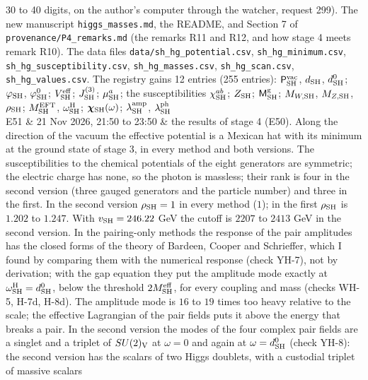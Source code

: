 \documentclass[
  10pt,
]{article}
\begin{document}
\begin{longtable}[]
30 to 40 digits, on the author's computer through the watcher, request
299). The new manuscript \texttt{higgs\_masses.md}, the README, and
Section 7 of \texttt{provenance/P4\_remarks.md} (the remarks R11 and
R12, and how stage 4 meets remark R10). The data files
\texttt{data/sh\_hg\_potential.csv}, \texttt{sh\_hg\_minimum.csv},
\texttt{sh\_hg\_susceptibility.csv}, \texttt{sh\_hg\_masses.csv},
\texttt{sh\_hg\_scan.csv}, \texttt{sh\_hg\_values.csv}. The registry
gains 12 entries (255 entries): \(\mathsf P^{\rm vac}_{\rm SH}\),
\(d_{\rm SH}\), \(d^0_{\rm SH}\); \(\varphi_{\rm SH}\),
\(\varphi^0_{\rm SH}\); \(V^{\rm eff}_{\rm SH}\); \(J^{(3)}_{\rm SH}\);
\(\mu^a_{\rm SH}\); the susceptibilities \(\chi^{ab}_{\rm SH}\);
\(Z_{\rm SH}\); \(\mathsf M^{\rm g}_{\rm SH}\); \(M_{W,{\rm SH}}\),
\(M_{Z,{\rm SH}}\), \(\rho_{\rm SH}\); \(M^{\rm EFT}_{\rm SH}\),
\(\omega^{\rm H}_{\rm SH}\); \(\boldsymbol\chi_{\rm SH}(\omega)\);
\(\lambda^{\rm amp}_{\rm SH}\), \(\lambda^{\rm ph}_{\rm SH}\) \\
E51 & 21 Nov 2026, 21:50 to 23:50 & the results of stage 4 (E50). Along
the direction of the vacuum the effective potential is a Mexican hat
with its minimum at the ground state of stage 3, in every method and
both versions. The susceptibilities to the chemical potentials of the
eight generators are symmetric; the electric charge has none, so the
photon is massless; their rank is four in the second version (three
gauged generators and the particle number) and three in the first. In
the second version \(\rho_{\rm SH}=1\) in every method (\(1\)); in the
first \(\rho_{\rm SH}\) is \(1.202\) to \(1.247\). With
\(v_{\rm SH}=246.22\) GeV the cutoff is \(2207\) to \(2413\) GeV in the
second version. In the pairing-only methods the response of the pair
amplitudes has the closed forms of the theory of Bardeen, Cooper and
Schrieffer, which I found by comparing them with the numerical response
(check YH-7), not by derivation; with the gap equation they put the
amplitude mode exactly at \(\omega^{\rm H}_{\rm SH}=d^0_{\rm SH}\),
below the threshold \(2M^{\rm eff}_{\rm SH}\), for every coupling and
mass (checks WH-5, H-7d, H-8d). The amplitude mode is \(16\) to \(19\)
times too heavy relative to the scale; the effective Lagrangian of the
pair fields puts it above the energy that breaks a pair. In the second
version the modes of the four complex pair fields are a singlet and a
triplet of \(SU(2)_{\rm V}\) at \(\omega=0\) and again at
\(\omega=d^0_{\rm SH}\) (check YH-8): the second version has the scalars
of two Higgs doublets, with a custodial triplet of massive scalars

\end{longtable}
\end{document}
